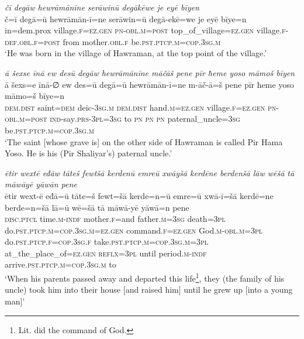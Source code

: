 \ea \label{ZP.3}
\textit{čī degāw hewrāmānīne serāwinū degākēwe je eyē bīyen} \\ 
\gll č=ī degā=ū hewrāmān-ī=ne serāwin=ū degā-ekē=we je eyē bīye=n \\ 
 in=dem.prox village\textsc{.f}\textsc{\textsc{=ez.gen}} \textsc{pn}\textsc{-obl}\textsc{.m}\textsc{=\textsc{post}} top\_of\_village\textsc{\textsc{=ez.gen}} village\textsc{.f}\textsc{-def}\textsc{.obl}\textsc{.f}\textsc{=\textsc{post}} from mother\textsc{.obl}\textsc{.f} be\textsc{.pst}\textsc{.ptcp}\textsc{.m}\textsc{=cop}\textsc{.3sg}\textsc{.m} \\ 
\glt `He was born in the village of Hawraman, at the top point of the village.'
\z 
 
\ea \label{ZP.6}
\textit{ā šexse īnā ew desū degāw hewrāmānīne māčāš pene pīr ħeme yoso māmoš bīyen} \\ 
\gll ā šexs=e īnā-∅ ew des=ū degā=ū hewrāmān-ī=ne m-āč-ā=š pene pīr ħeme yoso māmo=š bīye=n \\ 
 \textsc{dem.dist} saint\textsc{=dem} deic\textsc{-3sg}\textsc{.m} \textsc{dem.dist} hand\textsc{.m}\textsc{\textsc{=ez.gen}} village\textsc{.f}\textsc{\textsc{=ez.gen}} \textsc{pn}\textsc{-obl}\textsc{.m}\textsc{=\textsc{post}} \textsc{ind-}say\textsc{.prs}\textsc{-3pl}\textsc{=3sg} to \textsc{pn} \textsc{pn} \textsc{pn} paternal\_uncle\textsc{=3sg} be\textsc{.pst}\textsc{.ptcp}\textsc{.m}\textsc{=cop}\textsc{.3sg}\textsc{.m} \\ 
\glt `The saint [whose grave is] on the other side of Hawraman is called Pir Hama Yoso. He is his (Pir Shaliyar’s) paternal uncle.'
\z 
 
\ea \label{ZP.8}
\textit{ētir wextē eđāw tāteš fewtšā kerdenū emreū xwāyšā kerdēne berdenšā lāw wēšā tā māwāyē yāwān pene} \\ 
\gll ētir wext-ē eđā=ū tāte=š fewt=šā kerde=n=ū emre=ū xwā-ī=šā kerdē=ne berde=n=šā lā=ū wē=šā tā māwā-yē yāwā=n pene \\ 
 \textsc{disc.ptcl} time\textsc{.m}\textsc{-indf} mother\textsc{.f}=and father\textsc{.m}\textsc{=3sg} death\textsc{=3pl} do\textsc{.pst}\textsc{.ptcp}\textsc{.m}\textsc{=cop}\textsc{.3sg}\textsc{.m}\textsc{\textsc{=ez.gen}} command\textsc{.f}\textsc{\textsc{=ez.gen}} God\textsc{.m}\textsc{-obl}\textsc{.m}\textsc{=3pl} do\textsc{.pst}\textsc{.ptcp}\textsc{.f}\textsc{=cop}\textsc{.3sg}\textsc{.f} take\textsc{.pst}\textsc{.ptcp}\textsc{.m}\textsc{=cop}\textsc{.3sg}\textsc{.m}\textsc{=3pl} at\_the\_place\_of\textsc{\textsc{=ez.gen}} \textsc{reflx}\textsc{=3pl} until period\textsc{.m}\textsc{-indf} arrive\textsc{.pst}\textsc{.ptcp}\textsc{.m}\textsc{=cop}\textsc{.3sg}\textsc{.m} to \\ 
\glt `When his parents passed away and departed this life\footnote{Lit. did the command of God.}, they (the family of his uncle) took him into their house [and raised him] until he grew up [into a young man]'
\z 
 

